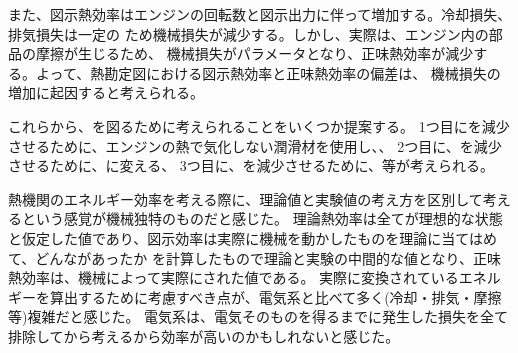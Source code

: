 また、図示熱効率はエンジンの回転数と図示出力に伴って増加する。冷却損失、排気損失は一定の
ため機械損失が減少する。しかし、実際は、エンジン内の部品の摩擦が生じるため、
機械損失がパラメータとなり、正味熱効率が減少する。よって、熱勘定図における図示熱効率と正味熱効率の偏差は、
機械損失の増加に起因すると考えられる。


これらから、を図るために考えられることをいくつか提案する。
1つ目にを減少させるために、エンジンの熱で気化しない潤滑材を使用し、、
2つ目に、を減少させるために、に変える、
3つ目に、を減少させるために、等が考えられる。

熱機関のエネルギー効率を考える際に、理論値と実験値の考え方を区別して考えるという感覚が機械独特のものだと感じた。
理論熱効率は全てが理想的な状態と仮定した値であり、図示効率は実際に機械を動かしたものを理論に当てはめて、どんながあったか
を計算したもので理論と実験の中間的な値となり、正味熱効率は、機械によって実際にされた値である。
実際に変換されているエネルギーを算出するために考慮すべき点が、電気系と比べて多く(冷却・排気・摩擦等)複雑だと感じた。
電気系は、電気そのものを得るまでに発生した損失を全て排除してから考えるから効率が高いのかもしれないと感じた。